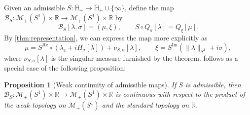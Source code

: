 \documentclass{cams-l} %
\newcommand{\RR}{\mathbb R}
\newcommand{\HH}{\mathbb H}
\newcommand{\cM}{\mathcal M}
\newcommand{\cB}{\mathcal B}
\newcommand{\ovl}[1]{{\overline{#1}}}
\newcommand{\op}{\operatorname}
\renewcommand{\Re}{\op{Re}}
\renewcommand{\Im}{\op{Im}}
\newtheorem{proposition}[theorem]{Proposition}
\theoremstyle{definition}
\theoremstyle{remark}
\numberwithin{equation}{section}
\begin{document}
Given an admissible $S:\ovl{\HH}_+\to\ovl{\HH}_+\cup\{\infty\}$, define the map $\mathcal{B}_{S}: \cM_+(S^1)\times\RR \to \cM_+(S^1)\times\RR$ by
\begin{equation}\label{eq:QBL}
    \cB_S[\lambda,\sigma] = (\mu,\xi),\qquad S\circ Q_\sigma[\lambda] = Q_\xi[\mu].
\end{equation}
By \cref{thm:representation}, we can express the map more explicitly as
\begin{equation*}
    \mu = S^{\Re}\circ(\lambda_c + iH_\sigma[\lambda]) + \nu_{S,\sigma}[\lambda],\qquad \xi = S^{\Im}(\|\lambda\|_{S^1}+i\sigma),
\end{equation*}
where $\nu_{S,\sigma}[\lambda]$ is the singular measure furnished by the theorem.  follows as a special case of the following proposition:
\begin{proposition}[Weak continuity of admissible maps]\label{prop:weakcont}
    If $S$ is admissible, then $\cB_{S}:\cM_+(S^1)\times\RR\to\cM_+(S^1)\times\RR$ is continuous with respect to the product of the weak topology on $\cM_+(S^1)$ and the standard topology on $\RR$.
\end{proposition}
\end{document}

